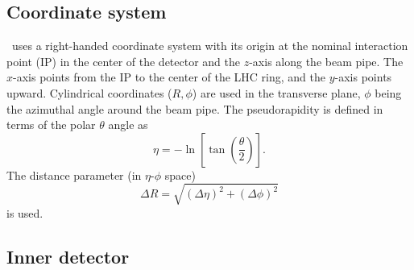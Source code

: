 \FloatBarrier
\subsection{Coordinate system} 
\label{sec:coordinate_system}

\atlas\ uses a right-handed coordinate system with its origin at the nominal
interaction point (IP) in the center of the detector and the $z$-axis
along the beam pipe. The $x$-axis points from the IP to the center of the
LHC ring, and the $y$-axis points upward. Cylindrical coordinates
($R,\phi$) are used in the transverse plane, $\phi$ being the azimuthal
angle around the beam pipe. The pseudorapidity is defined in terms of the
polar $\theta$ angle as
\begin{equation}
  \eta = -\ln\left[\tan(\frac{\theta}{2})\right].
\end{equation}
The distance parameter (in $\eta$-$\phi$ space)
\begin{equation}
  \Delta R = \sqrt{(\Delta \eta)^2 + (\Delta \phi)^2}
\end{equation}
is used.

\FloatBarrier
\subsection{Inner detector} 
\label{sec:id}

